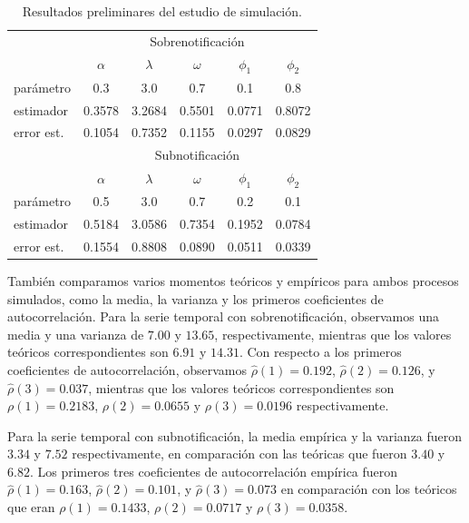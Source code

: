 \documentclass[12pt,twoside]{article} %
\begin{document}
\begin{table}[ht]\small
        \begin{center}
        \caption{Resultados preliminares del estudio de simulación.\label{tab1}}
        \begin{tabular}{lccccc}
        \hline
        & \multicolumn{5}{c}{Sobrenotificación}\\
        & $\alpha$&$\lambda$&$\omega$&$\phi_1$&$\phi_2$\\
         \hline
        parámetro & 0.3 & 3.0 & 0.7& 0.1& 0.8\\
        estimador & 0.3578 & 3.2684 & 0.5501 & 0.0771 &0.8072 \\
        error est. &  0.1054 & 0.7352 & 0.1155 & 0.0297 & 0.0829 \\
        \hline \hline 
        & \multicolumn{5}{c}{Subnotificación}\\
        & $\alpha$&$\lambda$&$\omega$&$\phi_1$&$\phi_2$\\
         \hline
        parámetro & 0.5 & 3.0 & 0.7& 0.2& 0.1\\
        estimador & 0.5184 & 3.0586 &  0.7354 & 0.1952  & 0.0784 \\
        error est. & 0.1554 & 0.8808 & 0.0890 & 0.0511 & 0.0339 \\
        \hline 
        \end{tabular}
        \end{center}
        \end{table}
        
        También comparamos varios momentos teóricos y empíricos para ambos procesos simulados, como la media, la varianza y los primeros coeficientes de autocorrelación. Para la serie temporal con sobrenotificación, observamos una media y una varianza de $7.00$ y $13.65$, respectivamente, mientras que los valores teóricos correspondientes son $6.91$ y $14.31$. Con respecto a los primeros coeficientes de autocorrelación, observamos ${\hat \rho}(1) = 0.192$, ${\hat \rho}(2) = 0.126$, y ${\hat \rho}(3) = 0.037$, mientras que los valores teóricos correspondientes son $\rho(1) = 0.2183$, $\rho(2) = 0.0655$ y $\rho(3) = 0.0196$ respectivamente.
        
        Para la serie temporal con subnotificación, la media empírica y la varianza fueron $3.34$ y $7.52$ respectivamente, en comparación con las teóricas que fueron $3.40$ y $6.82$. Los primeros tres coeficientes de autocorrelación empírica fueron ${\hat \rho}(1)=0.163$, ${\hat \rho}(2)=0.101$, y ${\hat \rho}(3 )=0.073$ en comparación con los teóricos que eran $\rho(1)=0.1433$, $\rho(2)=0.0717$ y $\rho(3)=0.0358$.
\end{document}
